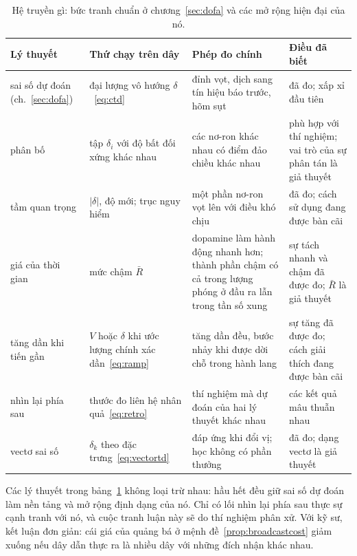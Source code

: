 \begin{table}[t]
\centering
\footnotesize
\setlength{\tabcolsep}{4pt}
\renewcommand{\arraystretch}{1.15}
\begin{tabular}{>{\raggedright}p{2.5cm}>{\raggedright}p{3.2cm}>{\raggedright}p{3.6cm}>{\raggedright\arraybackslash}p{4.2cm}}
\toprule
Lý thuyết & Thứ chạy trên dây & Phép đo chính & Điều đã biết \\
\midrule
sai số dự đoán (ch.~\ref{sec:dofa}) & đại lượng vô hướng $\delta$~\eqref{eq:ctd} & đỉnh vọt, dịch sang tín hiệu báo trước, hõm sụt & đã đo; xấp xỉ đầu tiên \\
phân bố & tập $\delta_i$ với độ bất đối xứng khác nhau & các nơ-ron khác nhau có điểm đảo chiều khác nhau & phù hợp với thí nghiệm; vai trò của sự phân tán là giả thuyết \\
tầm quan trọng & $|\delta|$, độ mới; trục nguy hiểm & một phần nơ-ron vọt lên với điều khó chịu & đã đo; cách sử dụng đang được bàn cãi \\
giá của thời gian & mức chậm $\bar R$ & dopamine làm hành động nhanh hơn; thành phần chậm có cả trong lượng phóng ở đầu ra lẫn trong tần số xung & sự tách nhanh và chậm đã được đo; $\bar R$ là giả thuyết \\
tăng dần khi tiến gần & $V$ hoặc $\delta$ khi ước lượng chính xác dần~\eqref{eq:ramp} & tăng dần đều, bước nhảy khi được dời chỗ trong hành lang & sự tăng đã được đo; cách giải thích đang được bàn cãi \\
nhìn lại phía sau & thước đo liên hệ nhân quả~\eqref{eq:retro} & thí nghiệm mà dự đoán của hai lý thuyết khác nhau & các kết quả mâu thuẫn nhau \\
vectơ sai số & $\delta_k$ theo đặc trưng~\eqref{eq:vectortd} & đáp ứng khi đổi vị; học không có phần thưởng & đã đo; dạng vectơ là giả thuyết \\
\bottomrule
\end{tabular}
\caption{Hệ  truyền gì: bức tranh chuẩn ở chương~\ref{sec:dofa} và các mở rộng hiện đại của nó.}
\label{tab:dofaalt}
\end{table}

Các lý thuyết trong bảng~\ref{tab:dofaalt} không loại trừ nhau: hầu hết đều giữ sai số dự đoán làm nền tảng và mở rộng định dạng của nó. Chỉ có lối nhìn lại phía sau thực sự cạnh tranh với nó, và cuộc tranh luận này sẽ do thí nghiệm phân xử. Với kỹ sư, kết luận đơn giản: cái giá của quảng bá ở mệnh đề~\ref{prop:broadcastcost} giảm xuống nếu dây dẫn thực ra là nhiều dây với những đích nhận khác nhau.

